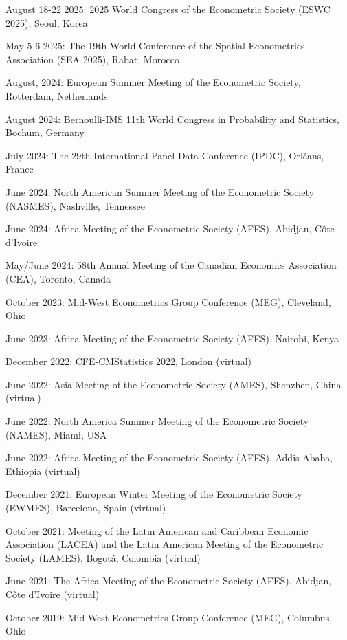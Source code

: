 \documentclass[12pt,letterpaper]{article}
\renewenvironment{itemize}{
  \begin{list}{}{
    \setlength{\leftmargin}{1.5em}
  }
}{
  \end{list}
}
\begin{document}
\begin{itemize}
  \item August 18-22 2025: 2025 World Congress of the Econometric Society (ESWC 2025), Seoul, Korea
  
  \item May 5-6 2025: The 19th World Conference of the Spatial Econometrics Association (SEA 2025), Rabat, Morocco
  
  \item August, 2024: European Summer Meeting of the Econometric Society, Rotterdam, Netherlands
  
  \item August 2024: Bernoulli-IMS 11th World Congress in Probability and Statistics, Bochum, Germany
  
  \item July 2024: The 29th International Panel Data Conference (IPDC), Orléans, France
  
  \item June 2024: North American Summer Meeting of the Econometric Society (NASMES), Nashville, Tennessee
  
  \item June 2024: Africa Meeting of the Econometric Society (AFES), Abidjan, Côte d'Ivoire
  
  \item May/June 2024: 58th Annual Meeting of the Canadian Economics Association (CEA), Toronto, Canada

  \item October 2023: Mid-West Econometrics Group Conference (MEG), Cleveland, Ohio
  \item June 2023: Africa Meeting of the Econometric Society (AFES), Nairobi, Kenya
  \item December 2022: CFE-CMStatistics 2022, London (virtual)
  \item June 2022: Asia Meeting of the Econometric Society (AMES), Shenzhen, China (virtual)
  \item June 2022: North America Summer Meeting of the Econometric Society (NAMES), Miami, USA
  \item June 2022: Africa Meeting of the Econometric Society (AFES), Addis Ababa, Ethiopia (virtual)
  \item December 2021: European Winter Meeting of the Econometric Society (EWMES), Barcelona, Spain (virtual)
  \item October 2021: Meeting of the Latin American and Caribbean Economic Association (LACEA) and the Latin American Meeting of the Econometric Society (LAMES), Bogotá, Colombia (virtual)
	\item June 2021: The Africa Meeting of the Econometric Society (AFES), Abidjan, C\^ote d'Ivoire (virtual)
	\item October 2019: Mid-West Econometrics Group Conference (MEG), Columbus, Ohio
\end{itemize}
\end{document}
